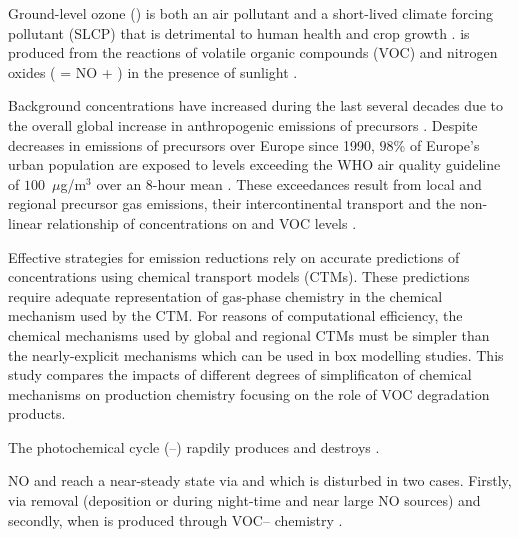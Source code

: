 Ground-level ozone () is both an air pollutant and a short-lived climate forcing pollutant (SLCP) that is detrimental to human health and crop growth \citep{AQEU:2014}. 
 is produced from the reactions of volatile organic compounds (VOC) and nitrogen oxides ( = NO + ) in the presence of sunlight \citep{Atkinson:2000}.

Background  concentrations have increased during the last several decades due to the overall global increase in anthropogenic emissions of  precursors \citep{HTAP:2010}.
Despite decreases in emissions of  precursors over Europe since 1990, $98$\% of Europe's urban population are exposed to levels exceeding the WHO air quality guideline of \mbox{$100$ $\mu$g/m$^3$} over an \mbox{$8$-hour} mean \citep{WHO:2006}. 
These exceedances result from local and regional  precursor gas emissions, their intercontinental transport and the non-linear relationship of  concentrations on  and VOC levels \citep{AQEU:2014}.

Effective strategies for emission reductions rely on accurate predictions of  concentrations using chemical transport models (CTMs). 
These predictions require adequate representation of gas-phase chemistry in the chemical mechanism used by the CTM. 
For reasons of computational efficiency, the chemical mechanisms used by global and regional CTMs must be simpler than the nearly-explicit mechanisms which can be used in box modelling studies.
This study compares the impacts of different degrees of simplificaton of chemical mechanisms on  production chemistry focusing on the role of VOC degradation products.

The photochemical cycle (--) rapdily produces and destroys . 
\begin{reactionlist}
\end{reactionlist}
NO and  reach a near-steady state via  and  which is disturbed in two cases. 
Firstly, via  removal (deposition or  during night-time and near large NO sources) and secondly, when  is produced through VOC-- chemistry \citep{Sillman:1999}.

